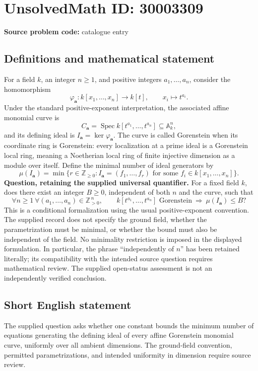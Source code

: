 \documentclass[11pt]{article}
\begin{document}
\section*{UnsolvedMath ID: 30003309}
\textbf{Source problem code:} catalogue entry
\subsection{Definitions and mathematical statement}
For a field \(k\), an integer \(n\geq 1\), and positive integers \(a_1,\ldots,a_n\), consider the homomorphism
\[
\varphi_{\mathbf a}:k[x_1,\ldots,x_n]\longrightarrow k[t],\qquad x_i\longmapsto t^{a_i}.
\]
Under the standard positive-exponent interpretation, the associated affine monomial curve is
\[
C_{\mathbf a}=\operatorname{Spec}k[t^{a_1},\ldots,t^{a_n}]\subseteq\mathbb A_k^n,
\]
and its defining ideal is \(I_{\mathbf a}=\ker\varphi_{\mathbf a}\). The curve is called Gorenstein when its coordinate ring is Gorenstein: every localization at a prime ideal is a Gorenstein local ring, meaning a Noetherian local ring of finite injective dimension as a module over itself. Define the minimal number of ideal generators by
\[
\mu(I_{\mathbf a})=\min\bigl\{r\in\mathbb Z_{\geq0}:I_{\mathbf a}=(f_1,\ldots,f_r)\text{ for some }f_i\in k[x_1,\ldots,x_n]\bigr\}.
\]
\textbf{Question, retaining the supplied universal quantifier.} For a fixed field \(k\), does there exist an integer \(B\geq0\), independent of both \(n\) and the curve, such that
\[
\forall n\geq1\ \forall(a_1,\ldots,a_n)\in\mathbb Z_{>0}^{\,n},\qquad
k[t^{a_1},\ldots,t^{a_n}]\text{ Gorenstein}
\ \Longrightarrow\ \mu(I_{\mathbf a})\leq B?
\]
This is a conditional formalization using the usual positive-exponent convention. The supplied record does not specify the ground field, whether the parametrization must be minimal, or whether the bound must also be independent of the field. No minimality restriction is imposed in the displayed formulation. In particular, the phrase ``independently of \(n\)'' has been retained literally; its compatibility with the intended source question requires mathematical review. The supplied open-status assessment is not an independently verified conclusion.
\subsection{Short English statement}
The supplied question asks whether one constant bounds the minimum number of equations generating the defining ideal of every affine Gorenstein monomial curve, uniformly over all ambient dimensions. The ground-field convention, permitted parametrizations, and intended uniformity in dimension require source review.
\end{document}
